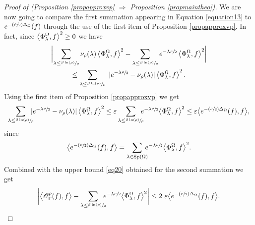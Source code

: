 \documentclass[10pt]{amsart}
\let\mathcal\mathscr
\let\epsilon\varepsilon
\newcommand{\Psfrac}[2]{(\sfrac{#1}{#2})}
\theoremstyle{plain}
\theoremstyle{definition}
\newcommand{\somme}[1]{\sum_{#1}}
\begin{document}
\begin{proof}[Proof of (Proposition \ref{propapproxvp}
$\Rightarrow$ Proposition \ref{propmaintheo})]
We are now going to compare the first summation appearing in Equation \eqref{equation13} to $e^{- \Psfrac{\rho }{2} \Delta_{\Omega}}(f)$ through the use of the first item of Proposition \ref{propapproxvp}. In fact, since $\left<\Phi^{\Omega}_{\lambda},f \right>^2 \ge\nobreak 0$ we have
\begin{multline*}
\biggl| \somme{ \lambda \le \sfrac{\beta \ln (\rho)} {\rho}} \nu_{\rho}(\lambda) \left<\Phi^{\Omega}_{\lambda},f \right>^2 - \somme{ \lambda \le \sfrac{\beta \ln (\rho)} {\rho}} e^{-\lambda \sfrac{\rho}{2}} \left<\Phi^{\Omega}_{\lambda},f \right>^2 \biggr| \\
\le \somme{ \lambda \le \sfrac{\beta \ln (\rho)} {\rho}} \ | e^{-\lambda \sfrac{\rho}{2}} - \nu_{\rho}(\lambda) | \left<\Phi^{\Omega}_{\lambda},f \right>^2.
\end{multline*}
Using the first item of Proposition \ref{propapproxvp} we get
\[
\somme{ \lambda \le \sfrac{\beta \ln (\rho)} {\rho}}\hspace*{-2mm} | e^{-\lambda \sfrac{\rho}{2}} - \nu_{\rho}(\lambda) | \left<\Phi^{\Omega}_{\lambda},f \right>^2 \le \epsilon \somme{ \lambda \le \sfrac{\beta \ln (\rho)} {\rho}}\hspace*{-2mm} e^{-\lambda \sfrac{\rho}{2}} \bigl<\Phi^{\Omega}_{\lambda},f \bigr>^2  \le \epsilon \bigl< e^{- \Psfrac{\rho}{2} \Delta_{\Omega}}(f), f \bigr>,
\]
since
\begin{equation}
\label{eqdemmaintheo3000}
\bigl< e^{- \Psfrac{\rho}{2} \Delta_{\Omega}}(f), f \bigr> = \somme{ \lambda \in \mathrm{Sp}(\Omega)}\hspace*{-2mm} e^{-\lambda \sfrac{\rho}{2}} \bigl<\Phi^{\Omega}_{\lambda},f \bigr>^2.
\end{equation}
Combined with the upper bound \eqref{eq20} obtained for the second summation we get
\begin{equation}
\label{equation23}
\biggl| \bigl< \mathcal{O}_{\Gamma}^{\rho}(f),f \bigr> - \somme{ \lambda \le \sfrac{\beta \ln (\rho)} {\rho}}\hspace*{-2mm} e^{-\lambda \sfrac{\rho}{2}} \bigl<\Phi^{\Omega}_{\lambda},f \bigr>^2 \biggr| \le 2 \ \epsilon \bigl< e^{- \Psfrac{\rho}{2} \Delta_{\Omega}}(f), f \bigr>.
\end{equation}


\end{proof}
\end{document}
